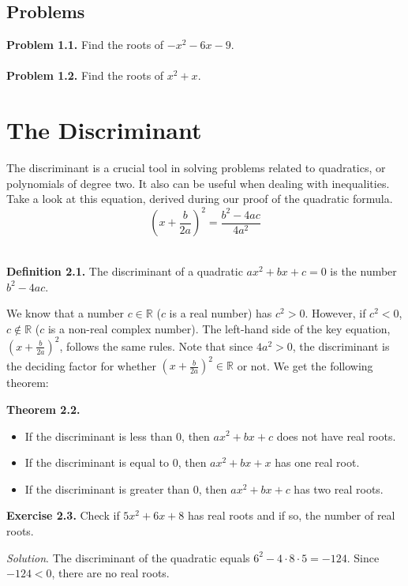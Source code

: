 \documentclass{article}
\begin{document}
\subsection{Problems}
\textbf{Problem 1.1.} Find the roots of $-x^2-6x-9$.\\\\
\textbf{Problem 1.2.} Find the roots of $x^2+x$.

\section{The Discriminant}
The discriminant is a crucial tool in solving problems related to quadratics, or polynomials of degree two. It also can be useful when dealing with inequalities.\\

Take a look at this equation, derived during our proof of the quadratic formula.
$$(x+\frac{b}{2a})^2=\frac{b^2-4ac}{4a^2}$$\\

\begin{mdframed}
  \textbf{Definition 2.1.} The discriminant of a quadratic $ax^2+bx+c=0$ is the number $b^2-4ac$.
\end{mdframed}

We know that a number $c \in \mathbb{R}$ ($c$ is a real number) has $c^2>0$. However, if $c^2<0$, $c \not\in \mathbb{R}$ ($c$ is a non-real complex number). The left-hand side of the key equation, $(x+\frac{b}{2a})^2$, follows the same rules. Note that since $4a^2 > 0$, the discriminant is the deciding factor for whether $(x+\frac{b}{2a})^2 \in \mathbb{R}$ or not. We get the following theorem:\\

\begin{mdframed}
    \textbf{Theorem 2.2.}
    \begin{itemize}
        \item If the discriminant is less than 0, then $ax^2+bx+c$ does not have real roots.
        \item If the discriminant is equal to 0, then $ax^2+bx+x$ has one real root.
        \item If the discriminant is greater than 0, then $ax^2+bx+c$ has two real roots.
    \end{itemize}
\end{mdframed}

\begin{mdframed}
  \textbf{Exercise 2.3.} Check if $5x^2+6x+8$ has real roots and if so, the number of real roots.
\end{mdframed}
\emph{Solution}. The discriminant of the quadratic equals $6^2-4\cdot8\cdot5 = -124$. Since $-124 < 0$, there are no real roots.
\end{document}

